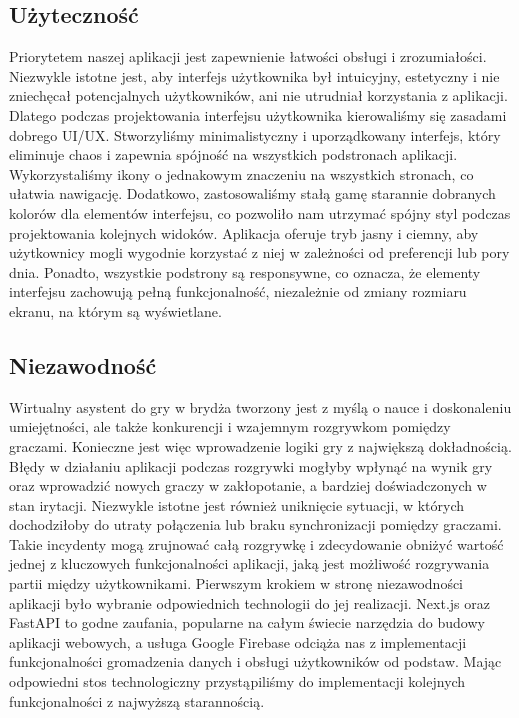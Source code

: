\subsection{Użyteczność}
Priorytetem naszej aplikacji jest zapewnienie łatwości obsługi i zrozumiałości. Niezwykle istotne jest, aby interfejs użytkownika był intuicyjny, estetyczny i nie zniechęcał potencjalnych użytkowników, ani nie utrudniał korzystania z aplikacji. Dlatego podczas projektowania interfejsu użytkownika kierowaliśmy się zasadami dobrego UI/UX. Stworzyliśmy minimalistyczny i uporządkowany interfejs, który eliminuje chaos i zapewnia spójność na wszystkich podstronach aplikacji. Wykorzystaliśmy ikony o jednakowym znaczeniu na wszystkich stronach, co ułatwia nawigację. Dodatkowo, zastosowaliśmy stałą gamę starannie dobranych kolorów dla elementów interfejsu, co pozwoliło nam utrzymać spójny styl podczas projektowania kolejnych widoków. Aplikacja oferuje tryb jasny i ciemny, aby użytkownicy mogli wygodnie korzystać z niej w zależności od preferencji lub pory dnia. Ponadto, wszystkie podstrony są responsywne, co oznacza, że elementy interfejsu zachowują pełną funkcjonalność, niezależnie od zmiany rozmiaru ekranu, na którym są wyświetlane.
\subsection{Niezawodność}
Wirtualny asystent do gry w brydża tworzony jest z myślą o nauce i doskonaleniu umiejętności, ale także konkurencji i wzajemnym rozgrywkom pomiędzy graczami. Konieczne jest więc wprowadzenie logiki gry z największą dokładnością. Błędy w działaniu aplikacji podczas rozgrywki mogłyby wpłynąć na wynik gry oraz wprowadzić nowych graczy w zakłopotanie, a bardziej doświadczonych w stan irytacji. Niezwykle istotne jest również uniknięcie sytuacji, w których dochodziłoby do utraty połączenia lub braku synchronizacji pomiędzy graczami. Takie incydenty mogą zrujnować całą rozgrywkę i zdecydowanie obniżyć wartość jednej z kluczowych funkcjonalności aplikacji, jaką jest możliwość rozgrywania partii między użytkownikami. Pierwszym krokiem w stronę niezawodności aplikacji było wybranie odpowiednich technologii do jej realizacji. Next.js oraz FastAPI to godne zaufania, popularne na całym świecie narzędzia do budowy aplikacji webowych, a usługa Google Firebase odciąża nas z implementacji funkcjonalności gromadzenia danych i obsługi użytkowników od podstaw. Mając odpowiedni stos technologiczny przystąpiliśmy do implementacji kolejnych funkcjonalności z najwyższą starannością. 

